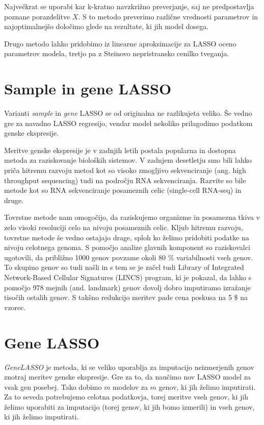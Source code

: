 \documentclass[onecolumn]{report}
\begin{document}
Največkrat se uporabi kar k-kratno navzkrižno preverjanje, saj ne predpostavlja poznane porazdelitve $X$. S to metodo preverimo različne vrednosti parametrov in najoptimalnejšo določimo glede na rezultate, ki jih model dosega. 

Drugo metodo lahko pridobimo iz linearne aproksimacije za LASSO oceno parametrov modela, tretjo pa z Steinovo nepristransko cenilko tveganja. 

\section{Sample in gene LASSO}

Varianti \emph{sample} in \emph{gene} LASSO se od originalna ne razlikujeta veliko. Še vedno gre za navadno LASSO regresijo, vendar model nekoliko prilagodimo podatkom genske ekspresije.

Meritve genske ekspresije je v zadnjih letih postala popularna in dostopna metoda za raziskovanje bioloških sistemov. V zadnjem desetletju smo bili lahko priča hitremu razvoju metod kot so visoko zmogljivo sekvenciranje (ang. high throughput sequencing) tudi na področju RNA sekvenciranja. Razvite so bile metode kot so RNA sekvenciranje posameznih celic (single-cell RNA-seq) in druge.

Tovrstne metode nam omogočijo, da raziskujemo organizme in posamezna tkiva v zelo visoki resoluciji celo na nivoju posameznih celic. Kljub hitremu razvoju, tovrstne metode še vedno ostajajo drage, sploh ko želimo pridobiti podatke na nivoju celotnega  genoma. S pomočjo analize glavnih komponent so raziskovalci ugotovili, da približno 1000 genov povzame okoli 80 \% variabilnosti vseh genov. To skupino genov so tudi našli in s tem se je začel tudi Library of Integrated Network-Based Cellular Signatures (LINCS) program, ki je pokazal, da lahko s pomočjo 978 mejnih (and. landmark) genov dovolj dobro imputiramo izražanje tisočih ostalih genov. S takšno redukcijo meritev pade cena poskusa na 5 \$ na vzorec. 

\section*{Gene LASSO}

\emph{GeneLASSO} je metoda, ki se veliko uporablja za imputacijo neizmerjenih genov znotraj meritev genske ekspresije. Gre za to, da naučimo nov LASSO model za vsak gen posebej. Tako dobimo $m$ modelov za $m$ genov, ki jih želimo imputirati. Za to seveda potrebujemo celotna podatkovja, torej meritve vseh genov, ki jih želimo uporabiti za imputacijo (torej genov, ki jih bomo izmerili) in vseh genov, ki jih želimo imputirati. 
\end{document}
